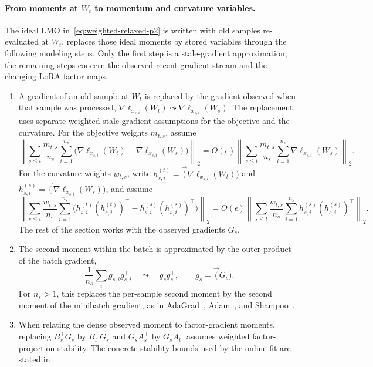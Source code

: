 \paragraph{From moments at $W_t$ to momentum and curvature variables.}
The ideal LMO in~\eqref{eq:weighted-relaxed-p2} is written with old samples
re-evaluated at $W_t$.  replaces those ideal moments by stored
variables through the following modeling steps. Only the first step is a
stale-gradient approximation; the remaining steps concern the observed recent
gradient stream and the changing LoRA factor maps.
\begin{enumerate}[leftmargin=1.6em,itemsep=2pt,topsep=2pt]
  \item A gradient of an old sample at $W_t$ is replaced by the gradient
  observed when that sample was processed,
  $\nabla\ell_{x_{s,i}}(W_t)\leadsto\nabla\ell_{x_{s,i}}(W_s)$.
  The replacement uses separate weighted stale-gradient assumptions for the
  objective and the curvature. For the objective weights $m_{t,s}$, assume
  \[
    \left\|
      \sum_{s\le t}\frac{m_{t,s}}{n_s}\sum_{i=1}^{n_s}
      \bigl(\nabla\ell_{x_{s,i}}(W_t)-\nabla\ell_{x_{s,i}}(W_s)\bigr)
    \right\|_2
    =
    O(\epsilon)
    \left\|
      \sum_{s\le t}\frac{m_{t,s}}{n_s}\sum_{i=1}^{n_s}
      \nabla\ell_{x_{s,i}}(W_s)
    \right\|_2 .
  \]
  For the curvature weights $w_{t,s}$, write
  $h^{(t)}_{s,i}=\vec(\nabla\ell_{x_{s,i}}(W_t))$ and
  $h^{(s)}_{s,i}=\vec(\nabla\ell_{x_{s,i}}(W_s))$, and assume
  \[
    \left\|
      \sum_{s\le t}\frac{w_{t,s}}{n_s}\sum_{i=1}^{n_s}
      \bigl(h^{(t)}_{s,i}(h^{(t)}_{s,i})^\top
      -h^{(s)}_{s,i}(h^{(s)}_{s,i})^\top\bigr)
    \right\|_2
    =
    O(\epsilon)
    \left\|
      \sum_{s\le t}\frac{w_{t,s}}{n_s}\sum_{i=1}^{n_s}
      h^{(s)}_{s,i}(h^{(s)}_{s,i})^\top
    \right\|_2 .
  \]
  The rest of the section works with the observed gradients $G_s$.
  \item The second moment within the batch is approximated by the outer
  product of the batch gradient,
  \[
    \frac1{n_s}\sum_i g_{s,i}g_{s,i}^\top
    \quad\leadsto\quad
    g_sg_s^\top,
    \qquad g_s=\vec(G_s).
  \]
  For $n_s>1$, this replaces the per-sample second moment by the
  second moment of the minibatch gradient, as in AdaGrad~\cite{adagrad},
  Adam~\cite{adam}, and Shampoo~\cite{shampoo}.
  \item When relating the dense observed moment to factor-gradient moments,
  replacing $B_s^\top G_s$ by $B_t^\top G_s$ and
  $G_sA_s^\top$ by $G_sA_t^\top$ assumes weighted factor-projection
  stability. The concrete stability bounds used by the online fit are stated in

\end{enumerate}

